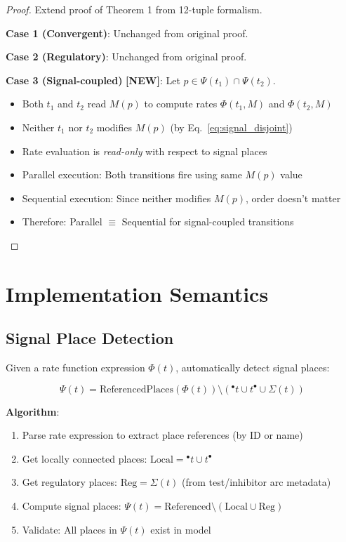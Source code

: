 \documentclass[11pt]{article}
\newcommand{\preset}[1]{{\ensuremath{^{\bullet}#1}}}
\newcommand{\postset}[1]{{\ensuremath{#1^{\bullet}}}}
\newcommand{\RegSet}[1]{{\Sigma(#1)}}
\newcommand{\SignalSet}[1]{{\Psi(#1)}}
\begin{document}
\begin{proof}
Extend proof of Theorem 1 from 12-tuple formalism.

\textbf{Case 1 (Convergent)}: Unchanged from original proof.

\textbf{Case 2 (Regulatory)}: Unchanged from original proof.

\textbf{Case 3 (Signal-coupled)} \textbf{[NEW]}: Let $p \in \SignalSet{t_1} \cap \SignalSet{t_2}$.
\begin{itemize}
    \item Both $t_1$ and $t_2$ read $M(p)$ to compute rates $\Phi(t_1, M)$ and $\Phi(t_2, M)$
    \item Neither $t_1$ nor $t_2$ modifies $M(p)$ (by Eq.~\ref{eq:signal_disjoint})
    \item Rate evaluation is \emph{read-only} with respect to signal places
    \item Parallel execution: Both transitions fire using same $M(p)$ value
    \item Sequential execution: Since neither modifies $M(p)$, order doesn't matter
    \item Therefore: Parallel $\equiv$ Sequential for signal-coupled transitions
\end{itemize}
\end{proof}

\section{Implementation Semantics}

\subsection{Signal Place Detection}

Given a rate function expression $\Phi(t)$, automatically detect signal places:

\begin{equation}
\SignalSet{t} = \text{ReferencedPlaces}(\Phi(t)) \setminus (\preset{t} \cup \postset{t} \cup \RegSet{t})
\end{equation}

\textbf{Algorithm}:
\begin{enumerate}
    \item Parse rate expression to extract place references (by ID or name)
    \item Get locally connected places: $\text{Local} = \preset{t} \cup \postset{t}$
    \item Get regulatory places: $\text{Reg} = \RegSet{t}$ (from test/inhibitor arc metadata)
    \item Compute signal places: $\SignalSet{t} = \text{Referenced} \setminus (\text{Local} \cup \text{Reg})$
    \item Validate: All places in $\SignalSet{t}$ exist in model
\end{enumerate}
\end{document}
